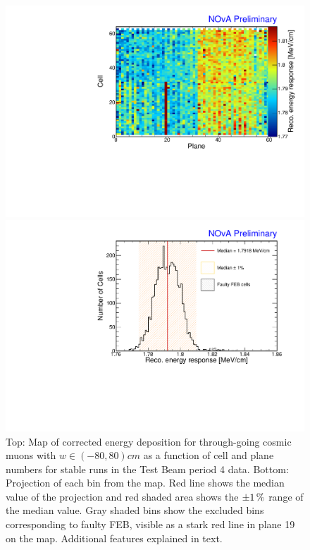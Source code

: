 \begin{figure}[!ht]
  \centering
  \includegraphics[width=0.7\linewidth]{Plots/PCListAna/TBDataP4_recomevcm_ts_zoomed.pdf}
  
  \includegraphics[width=0.7\linewidth]{Plots/PCListAna/Variation_recomevcm_TBDataP4_StableRuns_LimW.pdf}
  \caption[Map of corrected energy deposition for through-going cosmic muons in data]{Top: Map of corrected energy deposition for through-going cosmic muons with $w\in\left(-80,80\right)\unit{cm}$ as a function of cell and plane numbers for stable runs in the Test Beam period 4 data. Bottom: Projection of each bin from the map. Red line shows the median value of the projection and red shaded area shows the $\pm\unit[1]{\%}$ range of the median value. Gray shaded bins show the excluded bins corresponding to faulty \acrshort{FEB}, visible as a stark red line in plane 19 on the map. Additional features explained in text.}
  \label{fig:ValidPCListAnaMapData}
\end{figure}

